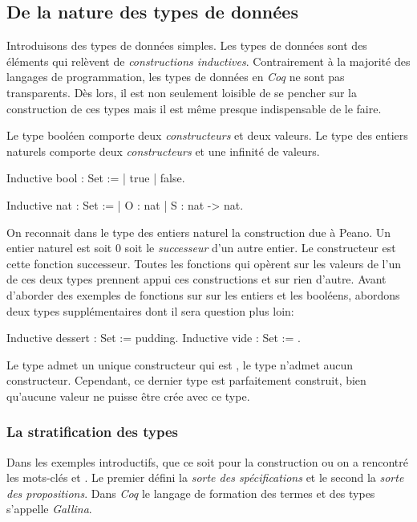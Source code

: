 \documentclass[a4paper,10pt]{article}
\begin{document}
\subsection{De la nature des types de données}
\label{sec:org6218efd}
Introduisons des types de données simples.  Les types de données sont des éléments qui relèvent de
\emph{constructions inductives}.  Contrairement à la majorité des langages de programmation, les types de
données en \emph{Coq} ne sont pas transparents.  Dès lors, il est non seulement loisible de se pencher sur
la construction de ces types mais il est même presque indispensable de le faire.

Le type booléen comporte deux \emph{constructeurs} et deux valeurs.  Le type des entiers naturels
comporte deux \emph{constructeurs} et une infinité de valeurs.

\begin{coq}[]
Inductive bool : Set :=
  | true
  | false.

Inductive nat : Set :=
  | O : nat
  | S : nat -> nat.
\end{coq}

On reconnait dans le type des entiers naturel la construction due à Peano.  Un entier naturel est soit \(0\)
soit le \emph{successeur} d'un autre entier.  Le constructeur  est cette fonction successeur.  Toutes les
fonctions qui opèrent sur les valeurs de l'un de ces deux types prennent appui ces constructions et sur rien
d'autre.  Avant d'aborder des exemples de fonctions sur sur les entiers et les booléens, abordons deux types
supplémentaires dont il sera question plus loin:

\begin{coq}[]
Inductive dessert : Set := pudding.
Inductive vide : Set := .
\end{coq}

Le type  admet un unique constructeur qui est , le type  n'admet aucun
constructeur. Cependant, ce dernier type est parfaitement construit, bien qu'aucune valeur ne puisse être
crée avec ce type.

\subsubsection{La stratification des types}
\label{sec:orgc04de78}
Dans les exemples introductifs, que ce soit pour la construction  ou  on a
rencontré les mots-clés  et .  Le premier défini la \emph{sorte des spécifications} et le second la
\emph{sorte des propositions}.  Dans \emph{Coq} le langage de formation des termes et des types s'appelle \emph{Gallina}.
\end{document}
